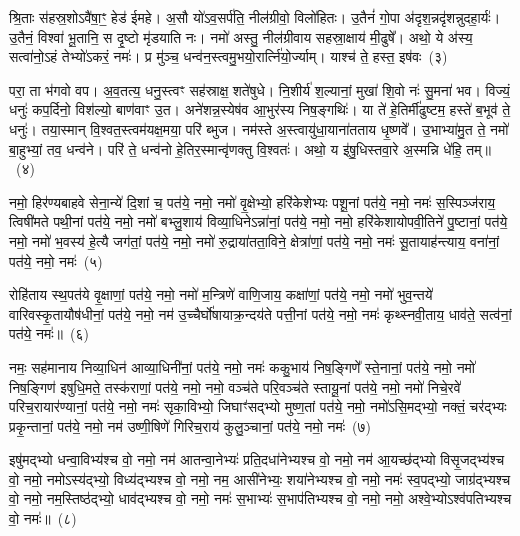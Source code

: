 श्रि॒ताः स॑हस्र॒शो\-ऽवै॑षा॒ꣳ॒ हेड॑ ईमहे। अ॒सौ यो॑\-ऽव॒सर्प॑ति॒ नील॑ग्रीवो॒ विलो॑हितः। उ॒तैनं॑ गो॒पा अ॑दृश॒न्नदृ॑शन्नुदहा॒र्यः॑। उ॒तैनं॒ विश्वा॑ भू॒तानि॒ स दृ॒ष्टो मृ॑डयाति नः। नमो॑ अस्तु॒ नील॑ग्रीवाय सहस्रा॒क्षाय॑ मी॒ढुषे᳚। अथो॒ ये अ॑स्य॒ सत्वा॑नो॒\-ऽहं तेभ्यो॑\-ऽकरं॒ नमः॑। प्र मु॑ञ्च॒ धन्व॑न॒स्त्वमु॒भयो॒रार्त्नि॑यो॒र्ज्याम्। याश्च॑ ते॒ हस्त॒ इष॑वः~(३)

परा॒ ता भ॑गवो वप। अ॒व॒तत्य॒ धनु॒स्त्वꣳ सह॑स्राक्ष॒ शते॑षुधे। नि॒शीर्य॑ श॒ल्यानां॒ मुखा॑ शि॒वो नः॑ सु॒मना॑ भव। विज्यं॒ धनुः॑ कप॒र्दिनो॒ विश॑ल्यो॒ बाण॑वाꣳ उ॒त। अने॑शन्न॒स्येष॑व आ॒भुर॑स्य निष॒ङ्गथिः॑। या ते॑ हे॒तिर्मी॑ढुष्टम॒ हस्ते॑ ब॒भूव॑ ते॒ धनुः॑। तया॒स्मान् वि॒श्वत॒स्त्वम॑यक्ष॒मया॒ परि॑ ब्भुज। नम॑स्ते अ॒स्त्वायु॑धा॒याना॑तताय धृ॒ष्णवे᳚। उ॒भाभ्या॑मु॒त ते॒ नमो॑ बा॒हुभ्यां॒ तव॒ धन्व॑ने। परि॑ ते॒ धन्व॑नो हे॒तिर॒स्मान्वृ॑णक्तु वि॒श्वतः॑। अथो॒ य इ॑षु॒धिस्तवा॒रे अ॒स्मन्नि धे॑हि॒ तम्॥~(४)

{\anuvakamend[{हस्ते॑ दि॒क्ष्विष॑व उ॒भाभ्यां॒ द्वाविꣳ॑शतिश्च}]}%

नमो॒ हिर॑ण्यबाहवे सेना॒न्ये॑ दि॒शां च॒ पत॑ये॒ नमो॒ नमो॑ वृ॒क्षेभ्यो॒ हरि॑केशेभ्यः पशू॒नां पत॑ये॒ नमो॒ नमः॑ स॒स्पिञ्ज॑राय॒ त्विषी॑मते पथी॒नां पत॑ये॒ नमो॒ नमो॑ बभ्लु॒शाय॑ विव्या॒धिने\-ऽन्ना॑नां॒ पत॑ये॒ नमो॒ नमो॒ हरि॑केशायोपवी॒तिने॑ पु॒ष्टानां॒ पत॑ये॒ नमो॒ नमो॑ भ॒वस्य॑ हे॒त्यै जग॑तां॒ पत॑ये॒ नमो॒ नमो॑ रु॒द्राया॑तता॒विने॒ क्षेत्रा॑णां॒ पत॑ये॒ नमो॒ नमः॑ सू॒तायाह॑न्त्याय॒ वना॑नां॒ पत॑ये॒ नमो॒ नमः॑~(५)

रोहि॑ताय स्थ॒पत॑ये वृ॒क्षाणां॒ पत॑ये॒ नमो॒ नमो॑ म॒न्त्रिणे॑ वाणि॒जाय॒ कक्षा॑णां॒ पत॑ये॒ नमो॒ नमो॑ भुव॒न्तये॑ वारिवस्कृ॒तायौष॑धीनां॒ पत॑ये॒ नमो॒ नम॑ उ॒च्चैर्घो॑षायाक्र॒न्दय॑ते पत्ती॒नां पत॑ये॒ नमो॒ नमः॑ कृथ्स्नवी॒ताय॒ धाव॑ते॒ सत्व॑नां॒ पत॑ये॒ नमः॑॥~(६)

{\anuvakamend[{वना॑नां॒ पत॑ये॒ नमो॒ नम॒ एका॒न्नत्रि॒ꣳ॒शच्च॑}]}%

नमः॒ सह॑मानाय निव्या॒धिन॑ आव्या॒धिनी॑नां॒ पत॑ये॒ नमो॒ नमः॑ ककु॒भाय॑ निष॒ङ्गिणे᳚ स्ते॒नानां॒ पत॑ये॒ नमो॒ नमो॑ निष॒ङ्गिण॑ इषुधि॒मते॒ तस्क॑राणां॒ पत॑ये॒ नमो॒ नमो॒ वञ्च॑ते परि॒वञ्च॑ते स्तायू॒नां पत॑ये॒ नमो॒ नमो॑ निचे॒रवे॑ परिच॒रायार॑ण्यानां॒ पत॑ये॒ नमो॒ नमः॑ सृका॒विभ्यो॒ जिघाꣳ॑सद्भ्यो मुष्ण॒तां पत॑ये॒ नमो॒ नमो॑\-ऽसि॒मद्भ्यो॒ नक्तं॒ चर॑द्भ्यः प्रकृ॒न्तानां॒ पत॑ये॒ नमो॒ नम॑ उष्णी॒षिणे॑ गिरिच॒राय॑ कुलु॒ञ्चानां॒ पत॑ये॒ नमो॒ नमः॑~(७)

इषु॑मद्भ्यो धन्वा॒विभ्य॑श्च वो॒ नमो॒ नम॑ आतन्वा॒नेभ्यः॑ प्रति॒दधा॑नेभ्यश्च वो॒ नमो॒ नम॑ आ॒यच्छ॑द्भ्यो विसृ॒जद्भ्य॑श्च वो॒ नमो॒ नमो\-ऽस्य॑द्भ्यो॒ विध्य॑द्भ्यश्च वो॒ नमो॒ नम॒ आसी॑नेभ्यः॒ शया॑नेभ्यश्च वो॒ नमो॒ नमः॑ स्व॒पद्भ्यो॒ जाग्र॑द्भ्यश्च वो॒ नमो॒ नम॒स्तिष्ठ॑द्भ्यो॒ धाव॑द्भ्यश्च वो॒ नमो॒ नमः॑ स॒भाभ्यः॑ स॒भाप॑तिभ्यश्च वो॒ नमो॒ नमो॒ अश्वे॒भ्यो\-ऽश्व॑पतिभ्यश्च वो॒ नमः॑॥~(८)


